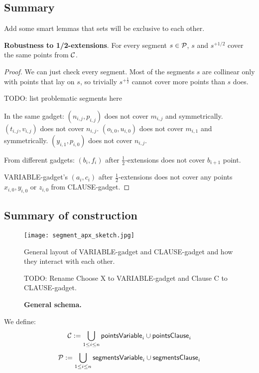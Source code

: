 \subsection{Summary}

Add some smart lemmas that sets will be exclusive to each other.

\begin{lemma}
\textbf{Robustness to 1/2-extensions}. For every segment $s \in \mathcal{P}$,
$s$ and $s^{+1/2}$ cover the same points from $\mathcal{C}$.
\end{lemma}

\begin{proof}
We can just check every segment. Most of the segments $s$
are collinear only with points that lay on $s$,
so trivially $s^{+\frac{1}{2}}$ cannot cover more points than $s$ does.

TODO: list problematic segments here

In the same gadget:
$(n_{i,j}, p_{i,j})$ does not cover $m_{i,j}$ and symmetrically.
$(t_{i,j}, v_{i,j})$ does not cover $n_{i,j}$.
$(o_{i,0}, u_{i,0})$ does not cover $m_{i,1}$ and symmetrically.
$(y_{i,1}, p_{i,0})$ does not cover $n_{i,j}$.



From different gadgets:
$(b_i, f_i)$ after $\frac{1}{2}$-extensions does not
cover $b_{i+1}$ point.

VARIABLE-gadget's $(a_i, c_i)$ after $\frac{1}{2}$-extensions does not
cover any points $x_{i,0}, y_{i,0}$ or $z_{i,0}$ from CLAUSE-gadget.


\end{proof}


\subsection{Summary of construction}

\begin{figure}
\centering
\texttt{[image: segment\_apx\_sketch.jpg]}
\caption{\textbf{General schema.}}
General layout of VARIABLE-gadget and CLAUSE-gadget and how they
interact with each other.

TODO: Rename Choose X to VARIABLE-gadget and Clause C to CLAUSE-gadget.
\label{fig:segment_apx_sketch}
\end{figure}

We define:
$$\mathcal{C} := \bigcup_{1 \le i \le n} \mathsf{pointsVariable}_{i} \cup \mathsf{pointsClause}_i $$
$$\mathcal{P} := \bigcup_{1 \le i \le n} \mathsf{segmentsVariable}_{i} \cup \mathsf{segmentsClause}_i $$

